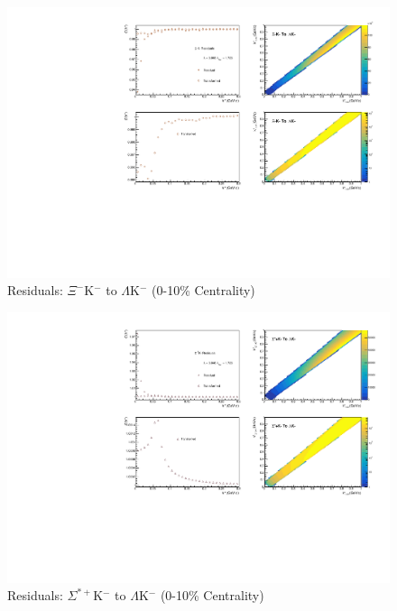 \documentclass[../AnalysisNoteJBuxton.tex]{subfiles}
\begin{document}
\begin{figure}[h]
  \centering
  \includegraphics[width=\textwidth]{9_AdditionalFigures/Figures/Residuals/LamKchM/Residuals_LamKchM_0010_XiKchM_MomResCrctn_NonFlatBgdCrctn_10Res_PrimMaxDecay4fm_UsingXiDataAndCoulombOnly.pdf}
  \caption[Residuals: $\Xi^{-}$K$^{-}$ to $\Lambda$K$^{-}$ (0-10\% Centrality)]{Residuals: $\Xi^{-}$K$^{-}$ to $\Lambda$K$^{-}$ (0-10\% Centrality)}
  \label{fig:Res_LamKchM_0010_XiCKchM}
\end{figure}


\begin{figure}[h]
  \centering
  \includegraphics[width=\textwidth]{9_AdditionalFigures/Figures/Residuals/LamKchM/Residuals_LamKchM_0010_SigStPKchM_MomResCrctn_NonFlatBgdCrctn_10Res_PrimMaxDecay4fm_UsingXiDataAndCoulombOnly.pdf}
  \caption[Residuals: $\Sigma^{*+}$K$^{-}$ to $\Lambda$K$^{-}$ (0-10\% Centrality)]{Residuals: $\Sigma^{*+}$K$^{-}$ to $\Lambda$K$^{-}$ (0-10\% Centrality)}
  \label{fig:Res_LamKchM_0010_SigStPKchM}
\end{figure}
\end{document}
